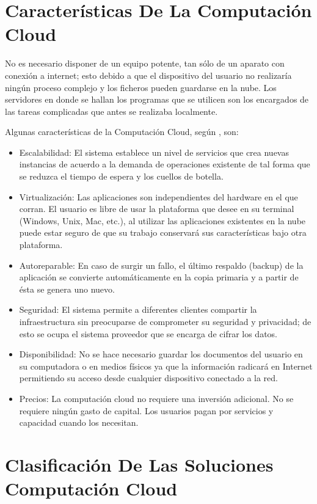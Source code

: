 \documentclass[a4paper, 12pt]{report}
\begin{document}
\section{Caracter\'isticas De La Computaci\'on Cloud}
\begin{justify}
No es necesario disponer de un equipo potente, tan s\'olo de un aparato con conexi\'on a internet; esto debido a que el dispositivo del usuario no realizar\'ia ning\'un proceso complejo y los ficheros pueden guardarse en la nube. Los servidores en donde se hallan los programas que se utilicen son los encargados de las tareas complicadas que antes se realizaba localmente.
\end{justify}
Algunas caracter\'isticas de la Computaci\'on Cloud, seg\'un \cite{oscarAvilaMejia}, son:
\begin{itemize}
    \item{Escalabilidad:} El sistema establece un nivel de servicios que crea nuevas instancias de acuerdo a la demanda de operaciones existente de tal forma que se reduzca el tiempo de espera y los cuellos de botella.
    \item{Virtualizaci\'on:} Las aplicaciones son independientes del hardware en el que corran. El usuario es libre de usar la plataforma que desee en su terminal (Windows, Unix, Mac, etc.), al utilizar las aplicaciones existentes en la nube puede estar seguro de que su trabajo conservar\'a sus caracter\'isticas bajo otra plataforma.
    \item{Autoreparable:} En caso de surgir un fallo, el \'ultimo respaldo (backup) de la aplicaci\'on se convierte autom\'aticamente en la copia primaria y a partir de \'esta se genera uno nuevo.
    \item{Seguridad:} El sistema permite a diferentes clientes compartir la infraestructura sin preocuparse de comprometer su seguridad y privacidad; de esto se ocupa el sistema proveedor que se encarga de cifrar los datos.
    \item{Disponibilidad: } No se hace necesario guardar los documentos del usuario en su computadora o en medios f\'isicos ya que la informaci\'on radicar\'a en Internet permitiendo su acceso desde cualquier dispositivo conectado a la red.
    \item{Precios:} La computaci\'on cloud no requiere una inversión adicional. No se requiere ning\'un gasto de capital. Los usuarios pagan por servicios y capacidad cuando los necesitan.
\end{itemize}
\section{Clasificaci\'on De Las Soluciones Computaci\'on Cloud}
\end{document}
